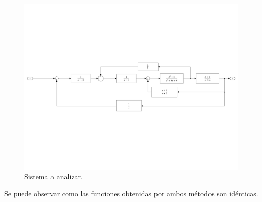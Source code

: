 \documentclass[journal, onecolumn]{IEEEtran}
\begin{document}
\begin{figure}[htbp!]
\begin{center}
    \includegraphics[width=0.8\linewidth]{system.pdf}
\end{center}
\caption{Sistema a analizar.}
\label{fig:system}
\end{figure}

Se puede observar como las funciones obtenidas por ambos métodos son idénticas.
\end{document}
